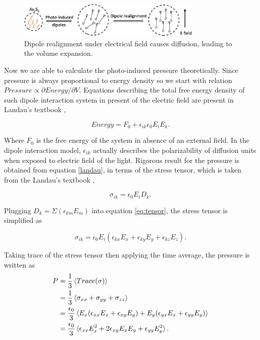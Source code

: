 \documentclass[twocolumn,showpacs,preprintnumbers,amsmath,amssymb]{revtex4}
\begin{document}
\begin{figure}[!htbp]
  \includegraphics[width=3.5in]{figure/diffusion.png}
  \caption{Dipole realignment under electrical field causes diffusion,
                                leading to the volume expansion.}
  \label{fig:realign}
\end{figure}

Now we are able to calculate the photo-induced pressure
theoretically. Since pressure is always proportional to energy density
so we start with relation $Pressure \propto \partial Energy / \partial
V$. Equations describing the total free energy density of such dipole
interaction system in present of the electric field are present in
Landau's textbook \cite{Landau},

\begin{equation}
  Energy = F_0 + \epsilon_{ik}\epsilon_0E_iE_k \mathrm{.}
  \label{landau}
\end{equation}

Where $F_0$ is the free energy of the system in absence of an external
field. In the dipole interaction model, $\epsilon_{ik}$ actually
describes the polarizability of diffusion units when exposed to
electric field of the light. Rigorous result for the pressure is
obtained from equation \ref{landau}, in terms of the stress tensor, which is
taken from the Landau's textbook \cite{Landau},

\begin{equation}
  \label{eq:tensor}
  \sigma_{ik} = \epsilon_0 E_i D_k \mathrm{.}
\end{equation}

Plugging $D_k = \Sigma (\epsilon_{km} E_m)$ into equation \ref{eq:tensor},
the stress tensor is simplified as

\begin{equation}
  \sigma_{ik} = \epsilon_0 E_i (\epsilon_{kx}E_x + \epsilon_{ky}E_y +
  \epsilon_{kz}E_z) \mathrm{.}
\end{equation}

Taking trace of the stress tensor then applying the time average,
the pressure is written as
\begin{equation}
  \label{eq:pressure1}
  \begin{split}
                                P &= \frac{1}{3}\braket{Trace(\sigma)} \\
                                &= \frac{1}{3}\braket{\sigma_{xx} + \sigma_{yy} + \sigma_{zz}} \\
                                &= \frac{\epsilon_0}{3}\braket{E_x(\epsilon_{xx}E_x + \epsilon_{xy}E_y) + E_y(\epsilon_{yx}E_x
                                  + \epsilon_{yy}E_y)}\\
                                &= \frac{\epsilon_0}{3}\braket{\epsilon_{xx}E_x^2 + 2
                                  \epsilon_{xy}E_xE_y + \epsilon_{yy}E_y^2} \mathrm{.}\\
  \end{split}
\end{equation}
\end{document}
